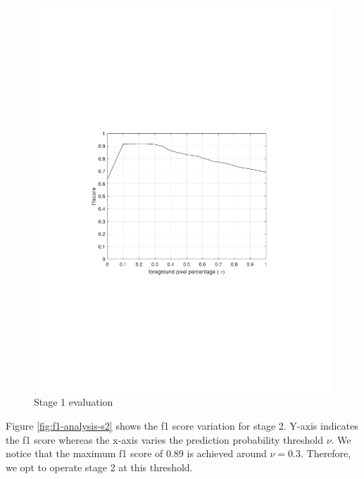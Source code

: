\begin{figure}
    \centering
    \includegraphics[width=\linewidth,trim={100 240 100 250},clip]{images/f1-analysis-mog}
    \caption{Stage 1 evaluation}
    \label{fig:f1-analysis-mog}
\end{figure}

Figure \ref{fig:f1-analysis-s2} shows the f1 score variation for stage 2. Y-axis indicates the f1 score whereas the x-axis varies the prediction probability threshold $\nu$. We notice that the maximum f1 score of 0.89 is achieved around $\nu=0.3$. Therefore, we opt to operate stage 2 at this threshold.

